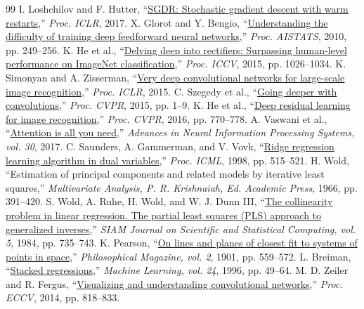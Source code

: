 \documentclass[conference,a4paper]{IEEEtran}
\begin{document}
\begin{thebibliography}{99}
 I. Loshchilov and F. Hutter, ``\href{https://arxiv.org/abs/1608.03983}{SGDR: Stochastic gradient descent with warm restarts},'' \emph{Proc. ICLR}, 2017.
 X. Glorot and Y. Bengio, ``\href{https://proceedings.mlr.press/v9/glorot10a.html}{Understanding the difficulty of training deep feedforward neural networks},'' \emph{Proc. AISTATS}, 2010, pp. 249--256.
 K. He et al., ``\href{https://openaccess.thecvf.com/content_iccv_2015/html/He_Delving_Deep_into_ICCV_2015_paper.html}{Delving deep into rectifiers: Surpassing human-level performance on ImageNet classification},'' \emph{Proc. ICCV}, 2015, pp. 1026--1034.
 K. Simonyan and A. Zisserman, ``\href{https://arxiv.org/abs/1409.1556}{Very deep convolutional networks for large-scale image recognition},'' \emph{Proc. ICLR}, 2015.
 C. Szegedy et al., ``\href{https://openaccess.thecvf.com/content_cvpr_2015/html/Szegedy_Going_Deeper_With_2015_CVPR_paper.html}{Going deeper with convolutions},'' \emph{Proc. CVPR}, 2015, pp. 1--9.
 K. He et al., ``\href{https://openaccess.thecvf.com/content_cvpr_2016/html/He_Deep_Residual_Learning_2016_CVPR_paper.html}{Deep residual learning for image recognition},'' \emph{Proc. CVPR}, 2016, pp. 770--778.
 A. Vaswani et al., ``\href{https://papers.nips.cc/paper_files/paper/2017/hash/3f5ee243547dee91fbd053c1c4a845aa-Abstract.html}{Attention is all you need},'' \emph{Advances in Neural Information Processing Systems, vol. 30}, 2017.
 C. Saunders, A. Gammerman, and V. Vovk, ``\href{https://eprints.soton.ac.uk/258942/}{Ridge regression learning algorithm in dual variables},'' \emph{Proc. ICML}, 1998, pp. 515--521.
 H. Wold, ``Estimation of principal components and related models by iterative least squares,'' \emph{Multivariate Analysis, P. R. Krishnaiah, Ed. Academic Press}, 1966, pp. 391--420.
 S. Wold, A. Ruhe, H. Wold, and W. J. Dunn III, ``\href{https://doi.org/10.1137/0905052}{The collinearity problem in linear regression. The partial least squares (PLS) approach to generalized inverses},'' \emph{SIAM Journal on Scientific and Statistical Computing, vol. 5}, 1984, pp. 735--743.
 K. Pearson, ``\href{https://doi.org/10.1080/14786440109462720}{On lines and planes of closest fit to systems of points in space},'' \emph{Philosophical Magazine, vol. 2}, 1901, pp. 559--572.
 L. Breiman, ``\href{https://doi.org/10.1007/BF00117832}{Stacked regressions},'' \emph{Machine Learning, vol. 24}, 1996, pp. 49--64.
 M. D. Zeiler and R. Fergus, ``\href{https://arxiv.org/abs/1311.2901}{Visualizing and understanding convolutional networks},'' \emph{Proc. ECCV}, 2014, pp. 818--833.
\end{thebibliography}
\end{document}
